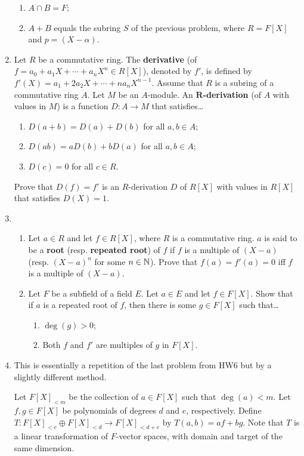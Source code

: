 \documentclass[../psets.tex]{subfiles}
\begin{document}
\begin{enumerate}
    \begin{enumerate}
        \item $A\cap B=F$;
        \item $A+B$ equals the subring $S$ of the previous problem, where $R=F[X]$ and $p=(X-\alpha)$.
    \end{enumerate}
    \item Let $R$ be a commutative ring. The \textbf{derivative} (of $f=a_0+a_1X+\cdots+a_nX^n\in R[X]$), denoted by $f'$, is defined by $f'(X)=a_1+2a_2X+\cdots+na_nX^{n-1}$. Assume that $R$ is a subring of a commutative ring $A$. Let $M$ be an $A$-module. An \textbf{$\bm{R}$-derivation} (of $A$ with values in $M$) is a function $D:A\to M$ that satisfies\dots
    \begin{enumerate}[label={(\arabic*)}]
        \item $D(a+b)=D(a)+D(b)$ for all $a,b\in A$;
        \item $D(ab)=aD(b)+bD(a)$ for all $a,b\in A$;
        \item $D(c)=0$ for all $c\in R$.
    \end{enumerate}
    Prove that $D(f)=f'$ is an $R$-derivation $D$ of $R[X]$ with values in $R[X]$ that satisfies $D(X)=1$.
    \item 
    \begin{enumerate}
        \item Let $a\in R$ and let $f\in R[X]$, where $R$ is a commutative ring. $a$ is said to be a \textbf{root} (resp. \textbf{repeated root}) of $f$ if $f$ is a multiple of $(X-a)$ (resp. $(X-a)^n$ for some $n\in\mathbb{N}$). Prove that $f(a)=f'(a)=0$ iff $f$ is a multiple of $(X-a)$.
        \item Let $F$ be a subfield of a field $E$. Let $a\in E$ and let $f\in F[X]$. Show that if $a$ is a repeated root of $f$, then there is some $g\in F[X]$ such that\dots
        \begin{enumerate}[label={(\arabic*)}]
            \item $\deg(g)>0$;
            \item Both $f$ and $f'$ are multiples of $g$ in $F[X]$.
        \end{enumerate}
    \end{enumerate}
    \item This is essentially a repetition of the last problem from HW6 but by a slightly different method.\par
    Let $F[X]_{<m}$ be the collection of $a\in F[X]$ such that $\deg(a)<m$. Let $f,g\in F[X]$ be polynomials of degrees $d$ and $e$, respectively. Define $T:F[X]_{<e}\oplus F[X]_{<d}\to F[X]_{<d+e}$ by $T(a,b)=af+bg$. Note that $T$ is a linear transformation of $F$-vector spaces, with domain and target of the same dimension.

\end{enumerate}
\end{document}
